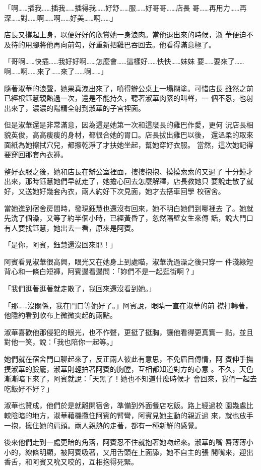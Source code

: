 「啊……插我……插我……插得我……好舒……服……好哥哥……店長
哥……再用力……再深……對……啊……啊……好美……啊……」

店長又撐起上身，以便好好的欣賞她一身浪肉。當他退出來的時候，淑
華便迫不及待的用腳將他再向前勾，好重新把雞巴吞回去。他看得滿意極了。

「哥啊……快插……我好好啊……怎麼會……這樣好……快快……妹妹
要……要來了……啊……啊……來了……來了……啊……」

隨著淑華的浪聲，她果真洩出來了，噴得辦公桌上一塌糊塗。可惜店長
雖然之前已經根鈺慧親熱過一次，還是不能持久，聽著淑華肉緊的叫聲，一
個不忍，也射出來了，濃濃的陽精全射到淑華的子宮裡面。

但是淑華還是非常滿意，因為這是她第一次和這麼長的雞巴作愛，更何
況店長相貌英俊，高高瘦瘦的身材，都很合她的胃口。店長拔出雞巴以後，
還溫柔的取來面紙為她擦拭穴兒，都擦乾淨了才扶她坐起，幫她穿好衣服。
當然，這次她記得要穿回那套內衣褲。

整好衣服之後，她和店長在辦公室裡面，摟摟抱抱、摸摸索索的又過了
十分鐘才出來，那時鈺慧她們早就走了，她擔心回去怎麼解釋，店長教她只
要說走散了就好，又送她好幾套內衣，兩人約好下次見面，她才去搭車回學
校宿舍。

當她進到宿舍房間時，發現鈺慧也還沒有回來，她不明白她們到哪裡去
了。她就先洗了個澡，又等了約半個小時，已經黃昏了，忽然隔壁女生來傳
話，說大門口有人要找鈺慧，她出去一看，原來是阿賓。

「是你，阿賓，鈺慧還沒回來耶！」

阿賓看見淑華很高興，眼光又在她身上到處瞄，淑華洗過澡之後只穿一
件淺綠短背心和一條白短褲，阿賓邊看邊問：「妳們不是一起逛街啊？」

「我們逛著逛著就走散了，我回來還沒看到她。」

「那……沒關係，我在門口等她好了。」阿賓說，眼睛一直在淑華的前
襟打轉著，他隱約看到軟布上微微突起的兩點。

淑華喜歡他那侵犯的眼光，也不作聲，更挺了挺胸，讓他看得更真實一
點，並且對他一笑，說：「我也陪你一起等。」

她們就在宿舍門口聊起來了，反正兩人彼此有意思，不免眉目傳情，阿
賓伸手撫摸淑華的臉龐，淑華則輕拍著阿賓的胸膛，互相都知道對方的心意
。不久，天色漸漸暗下來了，阿賓就說：「天黑了！她也不知道什麼時候才
會回來，我們一起去吃飯好不好？」

淑華也贊成，他們於是就離開宿舍，準備到外面餐店吃飯。路上經過校
園幾處比較陰暗的地方，淑華藉機攬住阿賓的臂彎，阿賓見她主動的親近過
來，就也放手一抱，擁住她的肩頭。兩人親熱的走著，都有一種新鮮的感覺。

後來他們走到一處更暗的角落，阿賓忍不住就抱著她吻起來。淑華的嘴
唇薄薄小小的，線條明顯，被阿賓吸著，又用舌頭在上面舔，她不自主的張
開嘴來，迎出香舌，和阿賓又吮又咬的，互相抱得死緊。

